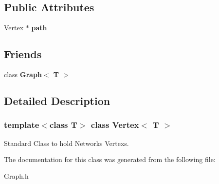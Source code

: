 \subsection*{Public Attributes}
\begin{DoxyCompactItemize}
\item 
\hypertarget{class_vertex_abd40febd917aa25add6bd42237c8463a}{}\label{class_vertex_abd40febd917aa25add6bd42237c8463a} 
\hyperlink{class_vertex}{Vertex} $\ast$ {\bfseries path}
\end{DoxyCompactItemize}
\subsection*{Friends}
\begin{DoxyCompactItemize}
\item 
\hypertarget{class_vertex_aefa9b76cd57411c5354e5620dc2d84dd}{}\label{class_vertex_aefa9b76cd57411c5354e5620dc2d84dd} 
class {\bfseries Graph$<$ T $>$}
\end{DoxyCompactItemize}


\subsection{Detailed Description}
\subsubsection*{template$<$class T$>$\newline
class Vertex$<$ T $>$}

Standard Class to hold Network\textquotesingle{}s Vertexs. 

The documentation for this class was generated from the following file\+:\begin{DoxyCompactItemize}
\item 
Graph.\+h\end{DoxyCompactItemize}
